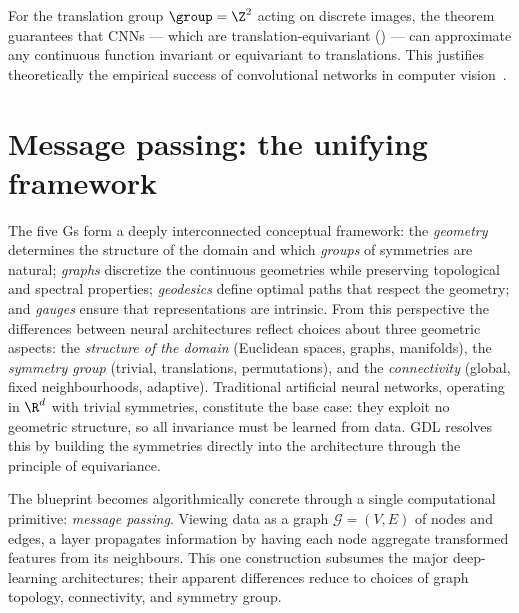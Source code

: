 \begin{example}
\label{ex:priors:cnn-universal}
For the translation group $\group = \Z^2$ acting on discrete images, the theorem
guarantees that CNNs --- which are translation-equivariant
() --- can approximate any continuous function invariant or
equivariant to translations. This justifies theoretically the empirical success
of convolutional networks in computer vision~\citep{cohen2016group}.
\end{example}

\section{Message passing: the unifying framework}
\label{sec:priors:message-passing}

The five Gs form a deeply interconnected conceptual framework: the
\emph{geometry} determines the structure of the domain and which \emph{groups}
of symmetries are natural; \emph{graphs} discretize the continuous geometries
while preserving topological and spectral properties; \emph{geodesics} define
optimal paths that respect the geometry; and \emph{gauges} ensure that
representations are intrinsic. From this perspective the differences between
neural architectures reflect choices about three geometric aspects: the
\emph{structure of the domain} (Euclidean spaces, graphs, manifolds), the
\emph{symmetry group} (trivial, translations, permutations), and the
\emph{connectivity} (global, fixed neighbourhoods, adaptive). Traditional
artificial neural networks, operating in $\R^d$ with trivial symmetries,
constitute the base case: they exploit no geometric structure, so all invariance
must be learned from data. GDL resolves this by building the symmetries directly
into the architecture through the principle of equivariance.

The blueprint becomes algorithmically concrete through a single computational
primitive: \emph{message passing}. Viewing data as a graph
$\mathcal{G} = (V, E)$ of nodes and edges, a layer propagates information by
having each node aggregate transformed features from its neighbours. This one
construction subsumes the major deep-learning architectures; their apparent
differences reduce to choices of graph topology, connectivity, and symmetry
group.


